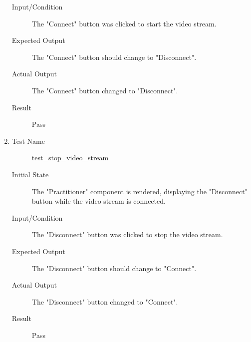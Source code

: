 \documentclass[12pt, titlepage]{article}
\begin{document}
\begin{enumerate}[UT-PV1]
\begin{description}
    \item[Input/Condition] The "Connect" button was clicked to start the video stream.
    \item[Expected Output] The "Connect" button should change to "Disconnect".
    \item[Actual Output]  The "Connect" button changed to "Disconnect".
    \item[Result] Pass
    \end{description}
  \item \label{UT-PV4}
    \begin{description}
    \item[Test Name] test\_stop\_video\_stream
    \item[Initial State] The "Practitioner" component is rendered, displaying the "Disconnect" button while the video stream is connected.
    \item[Input/Condition] The "Disconnect" button was clicked to stop the video stream.
    \item[Expected Output] The "Disconnect" button should change to "Connect".
    \item[Actual Output] The "Disconnect" button changed to "Connect".
    \item[Result] Pass
    \end{description}
\end{enumerate}
\end{document}
